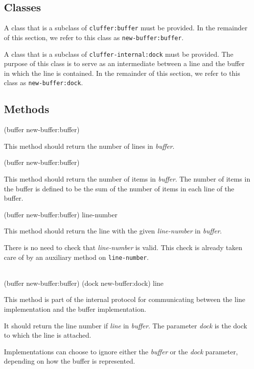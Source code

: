 \subsection{Classes}

A class that is a subclass of \texttt{cluffer:buffer} must be
provided.  In the remainder of this section, we refer to this class as
\texttt{new-buffer:buffer}.

A class that is a subclass of \texttt{cluffer-internal:dock} must be
provided.  The purpose of this class is to serve as an intermediate
between a line and the buffer in which the line is contained.
In the remainder of this section, we refer to this class as
\texttt{new-buffer:dock}.

\subsection{Methods}

 {(buffer new-buffer:buffer)}

This method should return the number of lines in \textit{buffer}.

 {(buffer new-buffer:buffer)}

This method should return the number of items in \textit{buffer}.
The number of items in the buffer is defined to be the sum of the
number of items in each line of the buffer.

 {(buffer new-buffer:buffer) line-number}

This method should return the line with the given \textit{line-number}
in \textit{buffer}.

There is no need to check that \textit{line-number} is valid.
This check is already taken care of by an auxiliary method on
\texttt{line-number}.

\\
{(buffer new-buffer:buffer) (dock new-buffer:dock) line}

This method is part of the internal protocol for communicating between
the line implementation and the buffer implementation.

It should return the line number if \textit{line} in \textit{buffer}.
The parameter \textit{dock} is the dock to which the line is attached.

Implementations can choose to ignore either the \textit{buffer} or the
\textit{dock} parameter, depending on how the buffer is represented.

